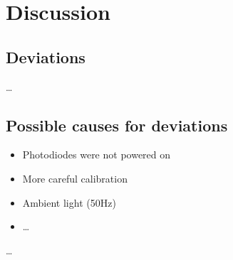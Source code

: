\section{Discussion}
\label{sec:diskussion}

\subsection{Deviations}

…


\subsection{Possible causes for deviations}

\begin{itemize}
    \item Photodiodes were not powered on
    \item More careful calibration
    \item Ambient light (50Hz)
    \item …
\end{itemize}
…
